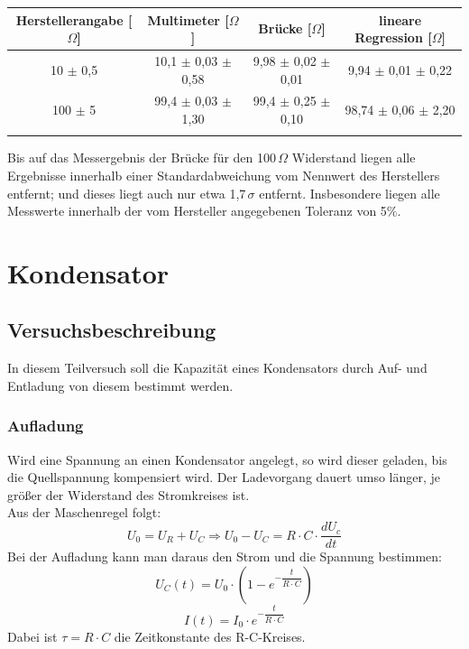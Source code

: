 \documentclass[12pt,a4paper]{article}
\begin{document}
\begin{center}
\begin{tabular}{|c|c|c|c|}
\hline 
Herstellerangabe [$\Omega$] & Multimeter [$\Omega$] & Brücke [$\Omega$] & lineare Regression [$\Omega$] \\ 
\hline 
10 $\pm$ 0,5 & 10,1 $\pm$ 0,03 $\pm$ 0,58 & 9,98 $\pm$ 0,02 $\pm$ 0,01 & 9,94 $\pm$ 0,01 $\pm$ 0,22 \\ 
\hline 
100 $\pm$ 5 & 99,4 $\pm$ 0,03 $\pm$ 1,30 & 99,4 $\pm$ 0,25 $\pm$ 0,10 & 98,74 $\pm$ 0,06 $\pm$ 2,20 \\ 
\hline 
\label{tab:Widerstand_Ergebnisse}
\end{tabular}
\end{center}

Bis auf das Messergebnis der Brücke für den 100$\, \Omega$ Widerstand liegen alle Ergebnisse innerhalb einer Standardabweichung vom Nennwert des Herstellers entfernt; und dieses liegt auch nur etwa 1,7$\, \sigma$ entfernt. Insbesondere liegen alle Messwerte innerhalb der vom Hersteller angegebenen Toleranz von 5$\%$.

\newpage
\section{Kondensator}
\subsection{Versuchsbeschreibung}
In diesem Teilversuch soll die Kapazität eines Kondensators durch Auf- und Entladung von diesem bestimmt werden.
\subsubsection{Aufladung}
Wird eine Spannung an einen Kondensator angelegt, so wird dieser geladen, bis die Quellspannung kompensiert wird. Der Ladevorgang dauert umso länger, je größer der Widerstand des Stromkreises ist.\\
Aus der Maschenregel folgt:
\begin{equation}
U_0 = U_R + U_C \Rightarrow U_0 - U_C = R\cdot C\cdot \dfrac{dU_c}{dt}
\label{Kondensator_DGL}
\end{equation}
Bei der Aufladung kann man daraus den Strom und die Spannung bestimmen:
\begin{equation}
U_C(t) = U_0 \cdot (1-e^{-\dfrac{t}{R\cdot C}})
\end{equation}
\begin{equation}
I(t) = I_0 \cdot e^{-\dfrac{t}{R\cdot C}}
\end{equation}
Dabei ist $\tau = R \cdot C$ die Zeitkonstante des R-C-Kreises.
\end{document}
